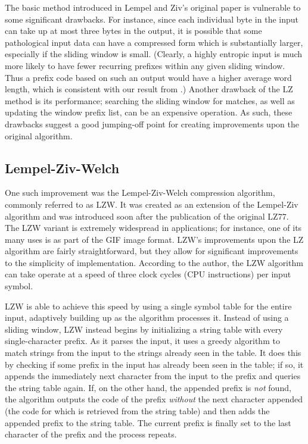 \documentclass[12pt]{article}
\begin{document}
The basic method introduced in Lempel and Ziv's original paper is
vulnerable to some significant drawbacks. For instance, since each
individual byte in the input can take up at most three bytes in the
output, it is possible that some pathological input data can have a
compressed form which is substantially larger, especially if the
sliding window is small. (Clearly, a highly entropic input is much
more likely to have fewer recurring prefixes within any given sliding
window. Thus a prefix code based on such an output would have a higher
average word length, which is consistent with our result from
.) Another drawback of the LZ method is its performance;
searching the sliding window for matches, as well as updating the
window prefix list, can be an expensive operation. As such, these
drawbacks suggest a good jumping-off point for creating improvements
upon the original algorithm.

\subsection{Lempel-Ziv-Welch}

One such improvement was the Lempel-Ziv-Welch compression algorithm,
commonly referred to as LZW. It was created as an extension of the
Lempel-Ziv algorithm and was introduced soon after the publication of
the original LZ77. The LZW variant is extremely widespread in
applications; for instance, one of its many uses is as part of the GIF
image format. LZW's improvements upon the LZ algorithm are fairly
straightforward, but they allow for significant improvements to the
simplicity of implementation. According to the author, the LZW
algorithm can take operate at a speed of three clock cycles (CPU
instructions) per input symbol. \cite{LempelZivWelch}

LZW is able to achieve this speed by using a single symbol table for
the entire input, adaptively building up as the algorithm processes
it. Instead of using a sliding window, LZW instead begins by
initializing a string table with every single-character prefix. As it
parses the input, it uses a greedy algorithm to match strings from the
input to the strings already seen in the table. It does this by
checking if some prefix in the input has already been seen in the
table; if so, it appends the immediately next character from the input
to the prefix and queries the string table again. If, on the other
hand, the appended prefix is \emph{not} found, the algorithm outputs
the code of the prefix \emph{without} the next character appended (the
code for which is retrieved from the string table) and then adds the
appended prefix to the string table. The current prefix is finally set
to the last character of the prefix and the process repeats.
\end{document}
